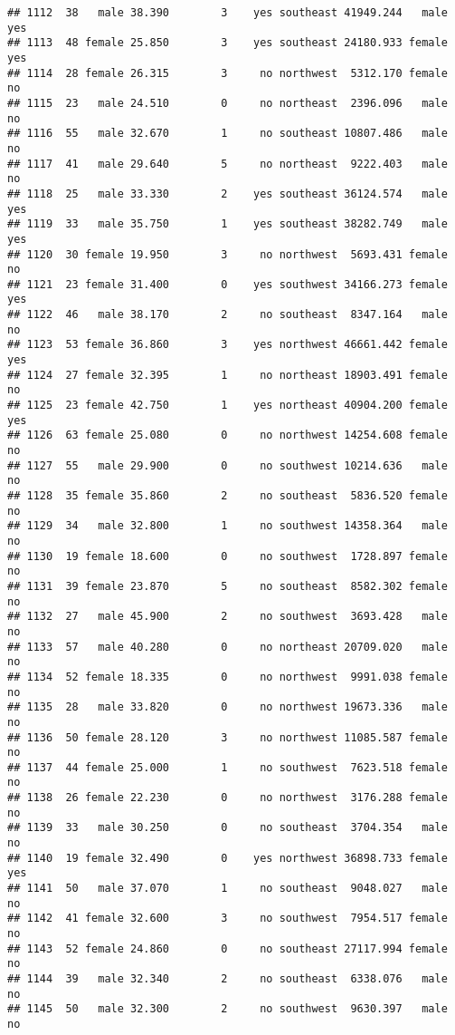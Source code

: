 \documentclass[
]{article}
\begin{document}
\begin{verbatim}
## 1112  38   male 38.390        3    yes southeast 41949.244   male      yes
## 1113  48 female 25.850        3    yes southeast 24180.933 female      yes
## 1114  28 female 26.315        3     no northwest  5312.170 female       no
## 1115  23   male 24.510        0     no northeast  2396.096   male       no
## 1116  55   male 32.670        1     no southeast 10807.486   male       no
## 1117  41   male 29.640        5     no northeast  9222.403   male       no
## 1118  25   male 33.330        2    yes southeast 36124.574   male      yes
## 1119  33   male 35.750        1    yes southeast 38282.749   male      yes
## 1120  30 female 19.950        3     no northwest  5693.431 female       no
## 1121  23 female 31.400        0    yes southwest 34166.273 female      yes
## 1122  46   male 38.170        2     no southeast  8347.164   male       no
## 1123  53 female 36.860        3    yes northwest 46661.442 female      yes
## 1124  27 female 32.395        1     no northeast 18903.491 female       no
## 1125  23 female 42.750        1    yes northeast 40904.200 female      yes
## 1126  63 female 25.080        0     no northwest 14254.608 female       no
## 1127  55   male 29.900        0     no southwest 10214.636   male       no
## 1128  35 female 35.860        2     no southeast  5836.520 female       no
## 1129  34   male 32.800        1     no southwest 14358.364   male       no
## 1130  19 female 18.600        0     no southwest  1728.897 female       no
## 1131  39 female 23.870        5     no southeast  8582.302 female       no
## 1132  27   male 45.900        2     no southwest  3693.428   male       no
## 1133  57   male 40.280        0     no northeast 20709.020   male       no
## 1134  52 female 18.335        0     no northwest  9991.038 female       no
## 1135  28   male 33.820        0     no northwest 19673.336   male       no
## 1136  50 female 28.120        3     no northwest 11085.587 female       no
## 1137  44 female 25.000        1     no southwest  7623.518 female       no
## 1138  26 female 22.230        0     no northwest  3176.288 female       no
## 1139  33   male 30.250        0     no southeast  3704.354   male       no
## 1140  19 female 32.490        0    yes northwest 36898.733 female      yes
## 1141  50   male 37.070        1     no southeast  9048.027   male       no
## 1142  41 female 32.600        3     no southwest  7954.517 female       no
## 1143  52 female 24.860        0     no southeast 27117.994 female       no
## 1144  39   male 32.340        2     no southeast  6338.076   male       no
## 1145  50   male 32.300        2     no southwest  9630.397   male       no

\end{verbatim}
\end{document}
